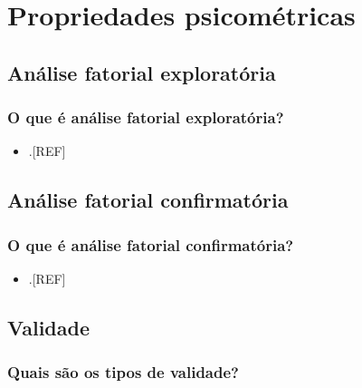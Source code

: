 \documentclass[
  a4paper,
]{book}
\providecommand{\tightlist}{%
  \setlength{\itemsep}{0pt}\setlength{\parskip}{0pt}}
\begin{document}
\hypertarget{propriedades-psicometricas}{%
\chapter{\texorpdfstring{\textbf{Propriedades psicométricas}}{Propriedades psicométricas}}\label{propriedades-psicometricas}}

\hypertarget{analise-fatorial-exploratoria}{%
\section{Análise fatorial exploratória}\label{analise-fatorial-exploratoria}}

\hypertarget{o-que-uxe9-anuxe1lise-fatorial-exploratuxf3ria}{%
\subsection{O que é análise fatorial exploratória?}\label{o-que-uxe9-anuxe1lise-fatorial-exploratuxf3ria}}

\begin{itemize}
\tightlist
\item
  .{[}REF{]}
\end{itemize}

\hypertarget{analise-fatorial-ocnfirmatoria}{%
\section{Análise fatorial confirmatória}\label{analise-fatorial-ocnfirmatoria}}

\hypertarget{o-que-uxe9-anuxe1lise-fatorial-confirmatuxf3ria}{%
\subsection{O que é análise fatorial confirmatória?}\label{o-que-uxe9-anuxe1lise-fatorial-confirmatuxf3ria}}

\begin{itemize}
\tightlist
\item
  .{[}REF{]}
\end{itemize}

\hypertarget{validade}{%
\section{Validade}\label{validade}}

\hypertarget{quais-suxe3o-os-tipos-de-validade}{%
\subsection{Quais são os tipos de validade?}\label{quais-suxe3o-os-tipos-de-validade}}
\end{document}
